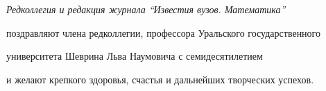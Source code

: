 


\pagestyle{empty}





\vspace*{4cm}



{\it Редколлегия и редакция журнала ``Известия вузов. Математика''

поздравляют члена редколлегии, профессора Уральского государственного

университета Шеврина Льва Наумовича с семидесятилетием

и желают крепкого здоровья, счастья и дальнейших творческих успехов.}







